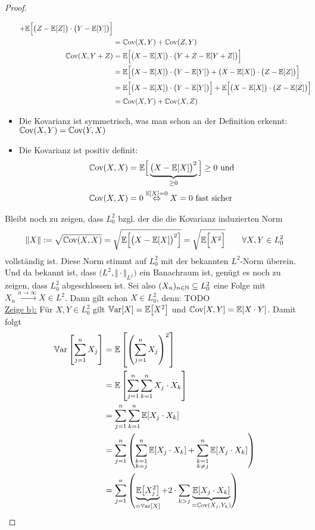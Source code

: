 \documentclass[12pt,a4paper]{article}
\begin{document}
\begin{proof}
\begin{itemize}
\begin{align*}
+\mathbb{E}\Big[\big(Z-\mathbb{E}[Z]\big)\cdot\big(Y-\mathbb{E}[Y]\big)\Big]\\
&=\mathbb{C}\text{ov}(X,Y)+\mathbb{C}\text{ov}(Z,Y)\\
\mathbb{C}\text{ov}(X,Y+Z)
&=\mathbb{E}\Big[\big(X-\mathbb{E}[X]\big)\cdot\big(Y+Z-\mathbb{E}[Y+Z]\big)\Big]\\
&=\mathbb{E}\Big[\big(X-\mathbb{E}[X]\big)\cdot\big(Y-\mathbb{E}[Y]\big)+\big(X-\mathbb{E}[X]\big)\cdot\big(Z-\mathbb{E}[Z]\big)\Big]\\
&=\mathbb{E}\Big[\big(X-\mathbb{E}[X]\big)\cdot\big(Y-\mathbb{E}[Y]\big)\Big]
+\mathbb{E}\Big[\big(X-\mathbb{E}[X]\big)\cdot\big(Z-\mathbb{E}[Z]\big)\Big]\\
&=\mathbb{C}\text{ov}(X,Y)+\mathbb{C}\text{ov}(X,Z)
\end{align*}
\item Die Kovarianz ist symmetrisch, was man schon an der Definition erkennt: $\mathbb{C}\text{ov}(X,Y)=\mathbb{C}\text{ov}(Y,X)$
\item Die Kovarianz ist positiv definit:
\begin{align*}
\mathbb{C}\text{ov}(X,X)&=\mathbb{E}\Big[\underbrace{\big(X-\mathbb{E}[X]\big)^2}_{\geq0}\Big]\geq0\text{ und}\\
\mathbb{C}\text{ov}(X,X)&=0\stackrel{\mathbb{E}[X]=0}{\Leftrightarrow} X=0\text{ fast sicher}
\end{align*}
\end{itemize}
Bleibt noch zu zeigen, dass $L_0^2$ bzgl. der die die Kovarianz induzierten Norm
\begin{align*}
\Vert X\Vert:=\sqrt{\mathbb{C}\text{ov}(X,X)}
=\sqrt{\mathbb{E}\Big[\big(X-\mathbb{E}[X]\big)^2\Big]}
=\sqrt{\mathbb{E}\Big[X^2\Big]}
\qquad\forall X,Y\in L_0^2
\end{align*}
vollständig ist. Diese Norm stimmt auf $L_0^2$ mit der bekannten $L^2$-Norm überein. Und da bekannt ist, dass $\big(L^2,\Vert\cdot\Vert_{L^2}\big)$ ein Banachraum ist, genügt es noch zu zeigen, dass $L_0^2$ abgeschlossen ist.
Sei also $(X_n)_{n\in\mathbb{N}}\subseteq L_0^2$ eine Folge mit
$X_n\stackrel{n\to\infty}{\longrightarrow}X\in L^2$.
Dann gilt schon $X\in L_0^2$, denn: TODO\\




\underline{Zeige b):} Für $X,Y\in L_0^2$ gilt $\mathbb{V}\text{ar}[X]=\mathbb{E}\big[X^2\big]$ und $\mathbb{C}\text{ov}[X,Y]=\mathbb{E}[X\cdot Y]$. Damit folgt
\begin{align*}
\mathbb{V}\text{ar}\left[\sum\limits_{j=1}^n X_j\right]
&=\mathbb{E}\left[\left(\sum\limits_{j=1}^n X_j\right)^2\right]\\
&=\mathbb{E}\left[\sum\limits_{j=1}^n\sum\limits_{k=1}^n X_j\cdot X_k\right]\\
&=\sum\limits_{j=1}^n\sum\limits_{k=1}^n \mathbb{E}[X_j\cdot X_k]\\
&=\sum\limits_{j=1}^n\left(
\sum\limits_{\begin{subarray}{c}k=1\\ k=j\end{subarray}}^n \mathbb{E}[X_j\cdot X_k]
+\sum\limits_{\begin{subarray}{c}k=1\\ k\neq j\end{subarray}}^n \mathbb{E}[X_j\cdot X_k]\right)\\
&=\sum\limits_{j=1}^n\left(\underbrace{\mathbb{E}\big[X_j^2\big]}_{=\mathbb{V}\text{ar}[X]}+2\cdot\sum\limits_{k>j}\underbrace{\mathbb{E}[X_j\cdot X_k]}_{=\mathbb{C}\text{ov}(X_j,Y_k)}\right)
\end{align*}


\end{proof}
\end{document}
